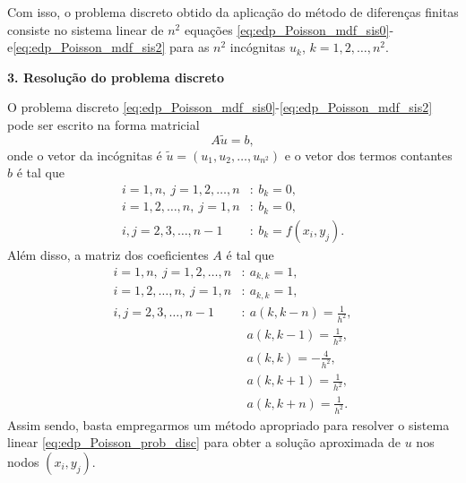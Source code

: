 Com isso, o problema discreto obtido da aplicação do método de diferenças finitas consiste no sistema linear de $n^2$ equações \eqref{eq:edp_Poisson_mdf_sis0}-e\eqref{eq:edp_Poisson_mdf_sis2} para as $n^2$ incógnitas $u_k$, $k=1, 2, \dotsc, n^2$.


\begin{flushleft}
  {\bf 3. Resolução do problema discreto}
\end{flushleft}

O problema discreto \eqref{eq:edp_Poisson_mdf_sis0}-\eqref{eq:edp_Poisson_mdf_sis2} pode ser escrito na forma matricial
\begin{equation}
  A\tilde{u} = b,\label{eq:edp_Poisson_prob_disc}
\end{equation}
onde o vetor da incógnitas é $\tilde{u}=(u_1, u_2, \dotsc, u_{n^2})$ e o vetor dos termos contantes $b$ é tal que
\begin{align}
  i=1,n,~j=1, 2, \dotsc, n &:~b_k = 0,\\
  i=1, 2, \dotsc, n,~j=1,n &:~b_k = 0,\\
  i,j=2, 3, \dotsc, n-1 &:~b_k = f(x_i,y_j).
\end{align}
Além disso, a matriz dos coeficientes $A$ é tal que
\begin{align}
  i=1,n,~j=1, 2, \dotsc, n &:~a_{k,k} = 1,\\
  i=1, 2, \dotsc, n,~j=1,n &:~a_{k,k} = 1,\\
  i,j=2, 3, \dotsc, n-1 &:~a(k,k-n)=\frac{1}{h^2},\\
                        &~~a(k,k-1)=\frac{1}{h^2},\\
                        &~~a(k,k)=-\frac{4}{h^2},\\
                        &~~a(k,k+1)=\frac{1}{h^2},\\
                        &~~a(k,k+n)=\frac{1}{h^2}.
\end{align}
Assim sendo, basta empregarmos um método apropriado para resolver o sistema linear \eqref{eq:edp_Poisson_prob_disc} para obter a solução aproximada de $u$ nos nodos $(x_i, y_j)$.


